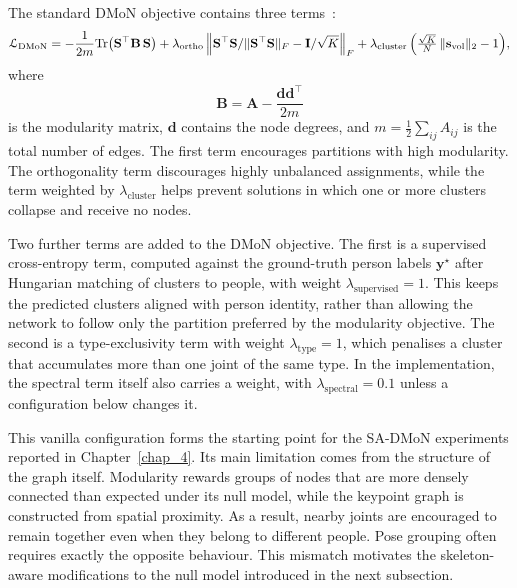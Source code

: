 The standard DMoN objective contains three
terms~\cite{tsitsulin2023dmon}:
\begin{equation}
    \mathcal{L}_{\text{DMoN}}
    = -\frac{1}{2m}\mathrm{Tr}\bigl(\mathbf{S}^\top \mathbf{B}\,\mathbf{S}\bigr)
      + \lambda_{\text{ortho}}\,
      \Bigl\|\mathbf{S}^\top \mathbf{S}/\|\mathbf{S}^\top \mathbf{S}\|_F - \mathbf{I}/\sqrt{K}\Bigr\|_F
      + \lambda_{\text{cluster}}\,\Bigl(\tfrac{\sqrt{K}}{N}\,\|\mathbf{s}_{\text{vol}}\|_2 - 1\Bigr),
    \label{eq:dmon_loss}
\end{equation}
where
\begin{equation}
    \mathbf{B}
    =
    \mathbf{A}
    -
    \frac{\mathbf{d}\mathbf{d}^{\top}}{2m}
\end{equation}
is the modularity matrix,
$\mathbf{d}$ contains the node degrees,
and $m = \tfrac{1}{2}\sum_{ij} A_{ij}$ is the total number of edges.
The first term encourages partitions with high modularity.
The orthogonality term discourages highly unbalanced assignments,
while the term weighted by $\lambda_{\text{cluster}}$
helps prevent solutions in which one or more clusters collapse
and receive no nodes.

Two further terms are added to the DMoN objective.
The first is a supervised cross-entropy term,
computed against the ground-truth person labels $\mathbf{y}^\star$
after Hungarian matching of clusters to people,
with weight $\lambda_{\text{supervised}}=1$.
This keeps the predicted clusters aligned with person identity,
rather than allowing the network to follow only the partition
preferred by the modularity objective.
The second is a type-exclusivity term with weight $\lambda_{\text{type}}=1$,
which penalises a cluster that accumulates
more than one joint of the same type.
In the implementation,
the spectral term itself also carries a weight,
with $\lambda_{\text{spectral}}=0.1$ unless a configuration below changes it.

This vanilla configuration forms the starting point
for the SA-DMoN experiments reported in Chapter~\ref{chap_4}.
Its main limitation comes from the structure of the graph itself.
Modularity rewards groups of nodes
that are more densely connected than expected under its null model,
while the keypoint graph is constructed from spatial proximity.
As a result, nearby joints are encouraged to remain together
even when they belong to different people.
Pose grouping often requires exactly the opposite behaviour.
This mismatch motivates the skeleton-aware modifications
to the null model introduced in the next subsection.

